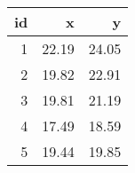 \begin{tabular}{rrr}
  \toprule
 id & x & y \\ 
  \midrule
    1 & 22.19 & 24.05 \\ 
    2 & 19.82 & 22.91 \\ 
    3 & 19.81 & 21.19 \\ 
    4 & 17.49 & 18.59 \\ 
    5 & 19.44 & 19.85 \\ 
   \bottomrule
\end{tabular}
